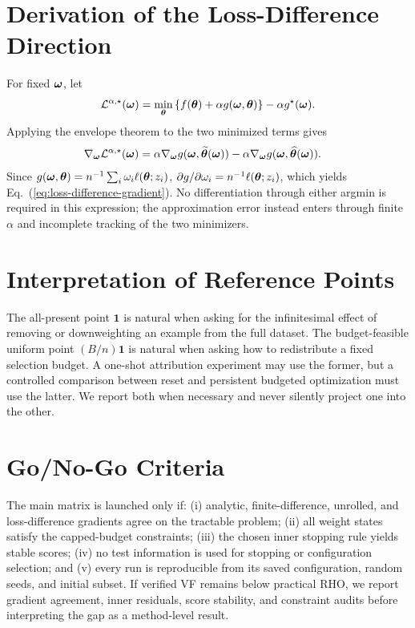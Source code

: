 \section{Derivation of the Loss-Difference Direction}
\label{app:derivation}

For fixed ${\bm{\omega}}$, let
\begin{equation}
\mathcal{L}^{\alpha,\star}({\bm{\omega}})
=\min_{{\bm{\theta}}}\left\{
f({\bm{\theta}})+\alpha g({\bm{\omega}},{\bm{\theta}})
\right\}
-\alpha g^\star({\bm{\omega}}).
\end{equation}
Applying the envelope theorem to the two minimized terms gives
\begin{align}
\nabla_{{\bm{\omega}}}\mathcal{L}^{\alpha,\star}({\bm{\omega}})
&=\alpha\nabla_{{\bm{\omega}}}
g({\bm{\omega}},\widetilde{{\bm{\theta}}}({\bm{\omega}}))
-\alpha\nabla_{{\bm{\omega}}}
g({\bm{\omega}},\widehat{{\bm{\theta}}}({\bm{\omega}})).
\end{align}
Since
$g({\bm{\omega}},{\bm{\theta}})=n^{-1}\sum_i\omega_i\ell({\bm{\theta}};z_i)$,
$\partial g/\partial\omega_i=n^{-1}\ell({\bm{\theta}};z_i)$, which yields
Eq.~(\ref{eq:loss-difference-gradient}). No differentiation through either
argmin is required in this expression; the approximation error instead enters
through finite $\alpha$ and incomplete tracking of the two minimizers.

\section{Interpretation of Reference Points}

The all-present point $\bm{1}$ is natural when asking for the infinitesimal
effect of removing or downweighting an example from the full dataset. The
budget-feasible uniform point $(B/n)\bm{1}$ is natural when asking how to
redistribute a fixed selection budget. A one-shot attribution experiment may
use the former, but a controlled comparison between reset and persistent
budgeted optimization must use the latter. We report both when necessary and
never silently project one into the other.

\section{Go/No-Go Criteria}

The main matrix is launched only if: (i) analytic, finite-difference, unrolled,
and loss-difference gradients agree on the tractable problem; (ii) all weight
states satisfy the capped-budget constraints; (iii) the chosen inner stopping
rule yields stable scores; (iv) no test information is used for stopping or
configuration selection; and (v) every run is reproducible from its saved
configuration, random seeds, and initial subset. If verified VF remains below
practical RHO, we report gradient agreement, inner residuals, score stability,
and constraint audits before interpreting the gap as a method-level result.
